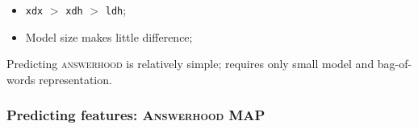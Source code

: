 \documentclass[handout,xcolor={dvipsnames}]{beamer}
\newcommand{\feat}[1]{\textsc{#1}}
\newcommand{\param}[1]{\texttt{#1}}
\begin{document}
\begin{frame}
\begin{itemize}
\pause
\item \param{xdx} $>$ \param{xdh} $>$ \param{ldh};
\pause
\item Model size makes little difference;
\end{itemize}

Predicting \feat{answerhood} is relatively simple; requires only small model and bag-of-words representation.

\end{frame}



\begin{frame}
\frametitle{Predicting features: \feat{Answerhood} MAP}

\small


\end{frame}
\end{document}
